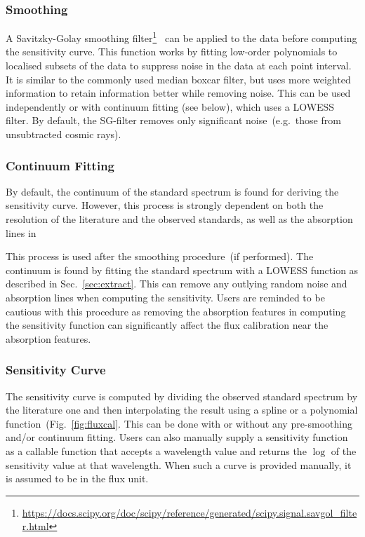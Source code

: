 \documentclass[twocolumn, linenumbers]{aastex631}
\begin{document}
\subsubsection*{Smoothing}
A Savitzky-Golay smoothing
filter\footnote{\url{https://docs.scipy.org/doc/scipy/reference/generated/scipy.signal.savgol_filter.html}}~\citep[hereafter, SG-filter]{1964AnaCh..36.1627S}
can be applied to the data before computing the sensitivity curve.
This function works by fitting low-order polynomials to localised
subsets of the data to suppress noise in the data at each point
interval. It is similar to the commonly used median boxcar filter,
but uses more weighted information to retain information better
while removing noise. This can be used independently or with
continuum fitting (see below), which uses a LOWESS filter. By default,
the SG-filter removes only significant noise~(e.g.\ those from
unsubtracted cosmic rays).

\subsubsection*{Continuum Fitting}
By default, the continuum of the standard spectrum is found for
deriving the sensitivity curve. However, this process is strongly
dependent on both the resolution of the literature and the observed
standards, as well as the absorption lines in 

This process is used after the
smoothing procedure~(if performed). The continuum is found by
fitting the standard spectrum with a LOWESS function as described in
Sec.~\ref{sec:extract}. This can remove any outlying random noise
and absorption lines when computing the sensitivity. Users
are reminded to be cautious with this procedure as removing the
absorption features in computing the sensitivity function can
significantly affect the flux calibration near the absorption features.

\subsubsection*{Sensitivity Curve}
The sensitivity curve is computed by dividing the observed standard
spectrum by the literature one and then interpolating the result using a
spline or a polynomial function~(Fig.~\ref{fig:fluxcal}. This can be
done with or without any pre-smoothing and/or continuum fitting. Users
can also manually supply a sensitivity function as a callable function
that accepts a wavelength value and returns the $\log$ of the sensitivity
value at that wavelength. When such a curve is provided manually, it
is assumed to be in the flux unit.
\end{document}
